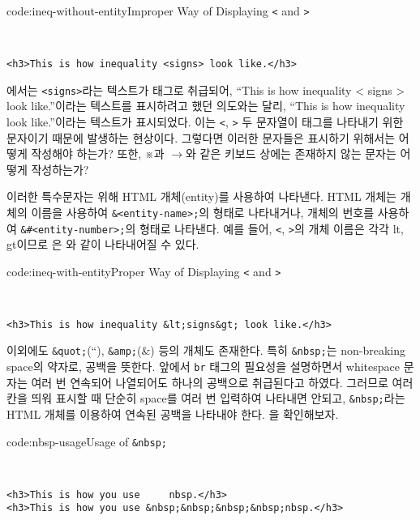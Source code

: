 \begin{codeenv}{code:ineq-without-entity}{Improper Way of Displaying \texttt{<} and \texttt{>}}\begin{verbatim}


<h3>This is how inequality <signs> look like.</h3>
\end{verbatim}
\end{codeenv}

에서는 \verb|<signs>|라는 텍스트가 태그로 취급되어, ``This is how inequality {\textless} signs {\textgreater} look like.''이라는 텍스트를 표시하려고 했던 의도와는 달리, ``This is how inequality look like.''이라는 텍스트가 표시되었다. 이는 \verb|<|, \verb|>| 두 문자열이 태그를 나타내기 위한 문자이기 때문에 발생하는 현상이다. 그렇다면 이러한 문자들은 표시하기 위해서는 어떻게 작성해야 하는가? 또한, ※과 $\rightarrow$와 같은 키보드 상에는 존재하지 않는 문자는 어떻게 작성하는가?

이러한 특수문자는 위해 HTML 개체(entity)를 사용하여 나타낸다. HTML 개체는 개체의 이름을 사용하여 \verb|&<entity-name>;|의 형태로 나타내거나, 개체의 번호를 사용하여 \verb|&#<entity-number>;|의 형태로 나타낸다. 예를 들어, \verb|<|, \verb|>|의 개체 이름은 각각 lt, gt이므로 은 와 같이 나타내어질 수 있다.

\begin{codeenv}{code:ineq-with-entity}{Proper Way of Displaying \texttt{<} and \texttt{>}}\begin{verbatim}


<h3>This is how inequality &lt;signs&gt; look like.</h3>
\end{verbatim}
\end{codeenv}

이외에도 \verb|&quot;|(``), \verb|&amp;|(\&) 등의 개체도 존재한다. 특히 \verb|&nbsp;|는 non-breaking space의 약자로, 공백을 뜻한다. 앞에서 \verb|br| 태그의 필요성을 설명하면서 whitespace 문자는 여러 번 연속되어 나열되어도 하나의 공백으로 취급된다고 하였다. 그러므로 여러 칸을 띄워 표시할 때 단순히 space를 여러 번 입력하여 나타내면 안되고, \verb|&nbsp;|라는 HTML 개체를 이용하여 연속된 공백을 나타내야 한다. 을 확인해보자.

\begin{codeenv}{code:nbsp-usage}{Usage of \texttt{\&nbsp;}}\begin{verbatim}


<h3>This is how you use     nbsp.</h3>
<h3>This is how you use &nbsp;&nbsp;&nbsp;&nbsp;nbsp.</h3>
\end{verbatim}
\end{codeenv}

